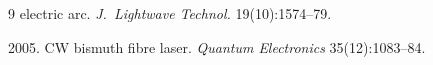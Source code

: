 {{\begin{thebibliography}{9}
electric arc. \textit{J.~Lightwave Technol.} 19(10):1574--79. 





 \label{end\stat}


 






2005. CW bismuth fibre laser. \textit{Quantum Electronics} 35(12):1083--84.


 


     


    








 \end{thebibliography}


} }





\renewcommand{\bibname}{\protect\rmfamily Литература}


